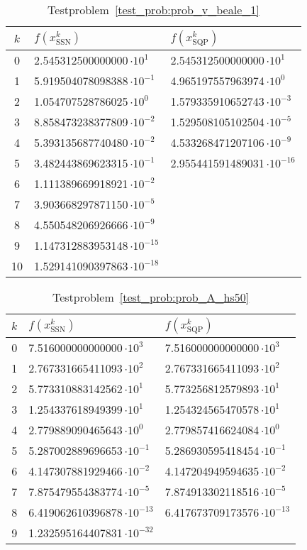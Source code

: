 
\begin{table}[h]
\centering
\begin{tabular*}{0.75\linewidth}{@{\extracolsep{\fill}}cll}
  \toprule
    $k$ & $f(x^k_\text{SSN})$ & $f(x^k_\text{SQP})$ \\
  \midrule
    0 & 2.545312500000000\,$\cdot10^{1}$  & 2.545312500000000\,$\cdot10^{1}$ \\
    1 & 5.919504078098388\,$\cdot10^{-1}$ & 4.965197557963974\,$\cdot10^{0}$ \\
    2 & 1.054707528786025\,$\cdot10^{0}$  & 1.579335910652743\,$\cdot10^{-3}$ \\
    3 & 8.858473238377809\,$\cdot10^{-2}$ & 1.529508105102504\,$\cdot10^{-5}$ \\
    4 & 5.393135687740480\,$\cdot10^{-2}$ & 4.533268471207106\,$\cdot10^{-9}$ \\
    5 & 3.482443869623315\,$\cdot10^{-1}$ & 2.955441591489031\,$\cdot10^{-16}$ \\
    6 & 1.111389669918921\,$\cdot10^{-2}$ & \\
    7 & 3.903668297871150\,$\cdot10^{-5}$ & \\
    8 & 4.550548206926666\,$\cdot10^{-9}$ & \\
    9 & 1.147312883953148\,$\cdot10^{-15}$ & \\
    10 & 1.529141090397863\,$\cdot10^{-18}$ & \\
  \bottomrule
\end{tabular*}
\caption{Testproblem~\ref{test_prob:prob_v_beale_1}}
\end{table}

\begin{table}[h]
\centering
\begin{tabular*}{0.75\linewidth}{@{\extracolsep{\fill}}cll}
  \toprule
    $k$ & $f(x^k_\text{SSN})$ & $f(x^k_\text{SQP})$ \\
  \midrule
  0 & 7.516000000000000\,$\cdot10^{3}$  & 7.516000000000000\,$\cdot10^{3}$ \\
  1 & 2.767331665411093\,$\cdot10^{2}$  & 2.767331665411093\,$\cdot10^{2}$ \\
  2 & 5.773310883142562\,$\cdot10^{1}$  & 5.773256812579893\,$\cdot10^{1}$ \\
  3 & 1.254337618949399\,$\cdot10^{1}$  & 1.254324565470578\,$\cdot10^{1}$ \\
  4 & 2.779889090465643\,$\cdot10^{0}$  & 2.779857416624084\,$\cdot10^{0}$ \\
  5 & 5.287002889696653\,$\cdot10^{-1}$ & 5.286930595418454\,$\cdot10^{-1}$ \\
  6 & 4.147307881929466\,$\cdot10^{-2}$ & 4.147204949594635\,$\cdot10^{-2}$ \\
  7 & 7.875479554383774\,$\cdot10^{-5}$ & 7.874913302118516\,$\cdot10^{-5}$ \\
  8 & 6.419062610396878\,$\cdot10^{-13}$ & 6.417673709173576\,$\cdot10^{-13}$ \\
  9 & 1.232595164407831\,$\cdot10^{-32}$ &   \\
  \bottomrule
\end{tabular*}
\caption{Testproblem~\ref{test_prob:prob_A_hs50}}
\end{table}

